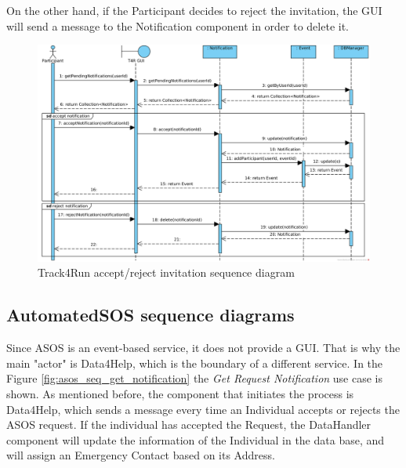 \documentclass[a4paper, hidelinks, 12pt]{report}
\begin{document}
	 On the other hand, if the Participant decides to reject the invitation, the GUI will send a message to the Notification component in order to delete it.\\
	\begin{figure}[H]
		\centering
		\includegraphics[width=1\textwidth]{diagrams/sequence_diagrams/t4r_accept_reject_notification.png}
		\caption[Track4Run accept/reject invitation sequence diagram]{Track4Run accept/reject invitation sequence diagram}
		\label{fig:t4r_seq_accept_invitation}
	\end{figure}	
	
	\subsection{AutomatedSOS sequence diagrams}
	Since ASOS is an event-based service, it does not provide a GUI. That is why the main "actor" is Data4Help, which is the boundary of a different service. In the Figure \ref{fig:asos_seq_get_notification} the \textit{Get Request Notification} use case is shown. As mentioned before, the component that initiates the process is Data4Help, which sends a message every time an Individual accepts or rejects the ASOS request. If the individual has accepted the Request, the DataHandler component will update the information of the Individual in the data base, and will assign an Emergency Contact based on its Address.\\
	
\end{document}
